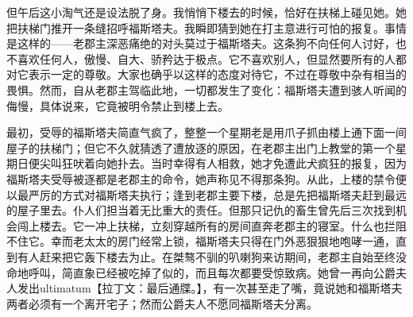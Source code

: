 \documentclass[12pt, UTF8]{ctexbook}
\begin{document}
\par 但午后这小淘气还是设法脱了身。我悄悄下楼去的时候，恰好在扶梯上碰见她。她把扶梯门推开一条缝招呼福斯塔夫。我瞬即猜到她在打主意进行可怕的报复。事情是这样的——老郡主深恶痛绝的对头莫过于福斯塔夫。这条狗不向任何人讨好，也不喜欢任何人，傲慢、自大、骄矜达于极点。它不喜欢别人，但显然要所有的人都对它表示一定的尊敬。大家也确乎以这样的态度对待它，不过在尊敬中杂有相当的畏惧。然而，自从老郡主驾临此地，一切都发生了变化：福斯塔夫遭到骇人听闻的侮慢，具体说来，它竟被明令禁止到楼上去。
\par 最初，受辱的福斯塔夫简直气疯了，整整一个星期老是用爪子抓由楼上通下面一间屋子的扶梯门；但它不久就猜透了遭放逐的原因，在老郡主出门上教堂的第一个星期日便尖叫狂吠着向她扑去。当时幸得有人相救，她才免遭此犬疯狂的报复，因为福斯塔夫受辱被逐都是老郡主的命令，她声称见不得那条狗。从此，上楼的禁令便以最严厉的方式对福斯塔夫执行；逢到老郡主要下楼，总是先把福斯塔夫赶到最远的屋子里去。仆人们担当着无比重大的责任。但那只记仇的畜生曾先后三次找到机会闯上楼去。它一冲上扶梯，立刻穿越所有的房间直奔老郡主的寝室。什么也拦阻不住它。幸而老太太的房门经常上锁，福斯塔夫只得在门外恶狠狠地咆哮一通，直到有人赶来把它轰下楼去为止。在桀骜不驯的叭喇狗来访期间，老郡主自始至终没命地呼叫，简直象已经被吃掉了似的，而且每次都要受惊致病。她曾一再向公爵夫人发出ultimatum【拉丁文：最后通牒。】，有一次甚至走了嘴，竟说她和福斯塔夫两者必须有一个离开宅子；然而公爵夫人不愿同福斯塔夫分离。
\end{document}
